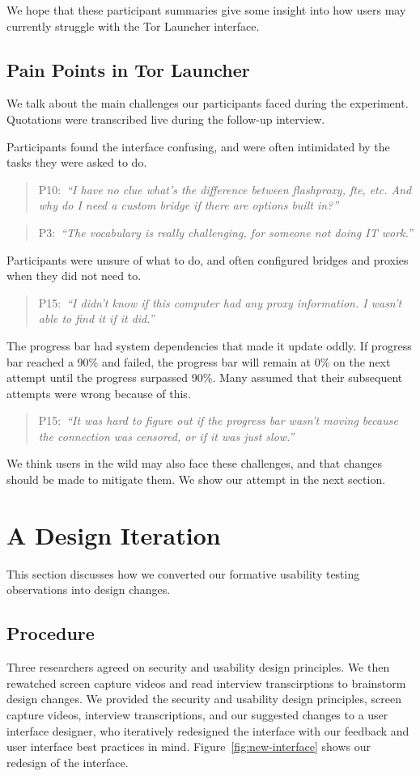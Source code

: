 \documentclass[USenglish,oneside,twocolumn]{article}
\newcommand{\pquote}[2]{
\begin{quotation}
\noindent #1:~\textit{#2}
\end{quotation}
}
\begin{document}
We hope that these participant summaries give some insight into how users may currently struggle with the Tor Launcher interface. 

\subsection{Pain Points in Tor Launcher} 
\label{sec:pain-points}
We talk about the main challenges our participants faced during the experiment. 
Quotations were transcribed live during the follow-up interview.

Participants found the interface confusing, and were often intimidated by the tasks they were asked to do. 

\pquote{P10}{``I have no clue what's the difference between flashproxy, fte, etc. And why do I need a custom bridge if there are options built in?''}

\pquote{P3}{``The vocabulary is really challenging, for someone not doing IT work.''}

Participants were unsure of what to do, and often configured bridges and proxies when they did not need to.  

\pquote{P15}{``I didn't know if this computer had any proxy information. I wasn't able to find it if it did.''}

The progress bar had system dependencies that made it update oddly. If progress bar reached a 90\% and failed, the progress bar will remain at 0\% on the next attempt until the progress surpassed 90\%. Many assumed that their subsequent attempts were wrong because of this.

\pquote{P15}{``It was hard to figure out if the progress bar wasn't moving because the connection was censored, or if it was just slow.''}

We think users in the wild may also face these challenges, and that changes should be made to mitigate them. We show our attempt in the next section. 

\section{A Design Iteration}
\label{sec:design} 
This section discusses how we converted our formative usability testing observations into design changes. 

\subsection{Procedure} 
Three researchers agreed on security and usability design principles. 
We then rewatched screen capture videos and read interview transcirptions to brainstorm design changes. We provided the security and usability design principles, screen capture videos, interview transcriptions, and our suggested changes to a user interface designer, who iteratively redesigned the interface with our feedback and user interface best practices in mind. Figure~\ref{fig:new-interface} shows our redesign of the interface. 
\end{document}
